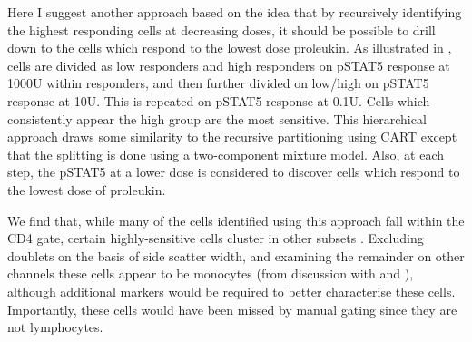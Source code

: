 Here I suggest another approach based on the idea that by recursively identifying the highest responding cells at decreasing doses, it should be
possible to drill down to the cells which respond to the lowest dose proleukin.
As illustrated in , cells are divided as low responders and high responders on pSTAT5 response at 1000U 
within responders, and then further divided on low/high on pSTAT5 response at 10U.
This is repeated on pSTAT5 response at 0.1U.
Cells which consistently appear the high group are the most sensitive.
This hierarchical approach draws some similarity to the recursive partitioning using \gls{CART} except that the splitting is done using a two-component mixture model.
Also, at each step, the pSTAT5 at a lower dose is considered to discover cells which respond to the lowest dose of proleukin.

We find that, while many of the cells identified using this approach fall within the CD4 gate,
certain highly-sensitive cells cluster in other subsets .
Excluding doublets on the basis of side scatter width,
and examining the remainder on other channels these cells appear to be monocytes (from discussion with  and ),
although additional markers would be required to better characterise these cells.
Importantly, these cells would have been missed by manual gating since they are not lymphocytes.


